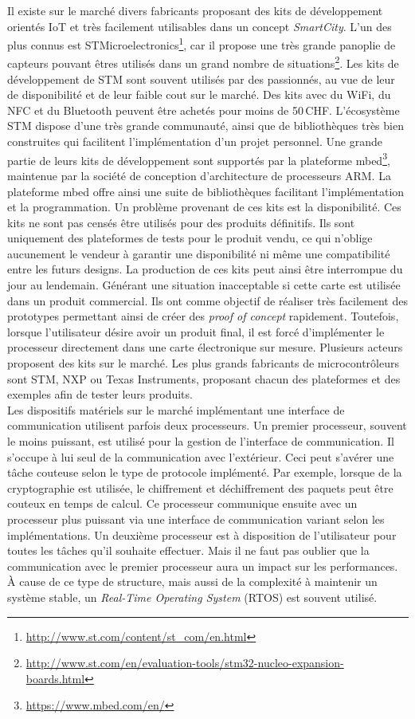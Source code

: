 Il existe sur le marché divers fabricants proposant des kits de développement orientés IoT et très facilement utilisables dans un concept \textit{SmartCity}. L'un des plus connus est STMicroelectronics\footnote{\url{http://www.st.com/content/st_com/en.html}}, car il propose une très grande panoplie de capteurs pouvant êtres utilisés dans un grand nombre de situations\footnote{\url{http://www.st.com/en/evaluation-tools/stm32-nucleo-expansion-boards.html}}. Les kits de développement de STM sont souvent utilisés par des passionnés, au vue de leur de disponibilité et de leur faible cout sur le marché. Des kits avec du WiFi, du NFC et du Bluetooth peuvent être achetés pour moins de 50\,CHF. L'écosystème STM dispose d'une très grande communauté, ainsi que de bibliothèques très bien construites qui facilitent l'implémentation d'un projet personnel. Une grande partie de leurs kits de développement sont supportés par la plateforme mbed\footnote{\url{https://www.mbed.com/en/}}, maintenue par la société de conception d'architecture de processeurs ARM. La plateforme mbed offre ainsi une suite de bibliothèques facilitant l'implémentation et la programmation. Un problème provenant de ces kits est la disponibilité. Ces kits ne sont pas censés être utilisés pour des produits définitifs. Ils sont uniquement des plateformes de tests pour le produit vendu, ce qui n'oblige aucunement le vendeur à garantir une disponibilité ni même une compatibilité entre les futurs designs. La production de ces kits peut ainsi être interrompue du jour au lendemain. Générant une situation inacceptable si cette carte est utilisée dans un produit commercial. Ils ont comme objectif de réaliser très facilement des prototypes permettant ainsi de créer des \textit{proof of concept} rapidement. Toutefois, lorsque l'utilisateur désire avoir un produit final, il est forcé d'implémenter le processeur directement dans une carte électronique sur mesure. Plusieurs acteurs proposent des kits sur le marché. Les plus grands fabricants de microcontrôleurs sont STM, NXP ou Texas Instruments, proposant chacun des plateformes et des exemples afin de tester leurs produits. \\

Les dispositifs matériels sur le marché implémentant une interface de communication utilisent parfois deux processeurs. Un premier processeur, souvent le moins puissant, est utilisé pour la gestion de l'interface de communication. Il s'occupe à lui seul de la communication avec l'extérieur. Ceci peut s'avérer une tâche couteuse selon le type de protocole implémenté. Par exemple, lorsque de la cryptographie est utilisée, le chiffrement et déchiffrement des paquets peut être couteux en temps de calcul. Ce processeur communique ensuite avec un processeur plus puissant via une interface de communication variant selon les implémentations. Un deuxième processeur est à disposition de l'utilisateur pour toutes les tâches qu'il souhaite effectuer. Mais il ne faut pas oublier que la communication avec le premier processeur aura un impact sur les performances. À cause de ce type de structure, mais aussi de la complexité à maintenir un système stable, un \textit{Real-Time Operating System} (RTOS) est souvent utilisé.\\

